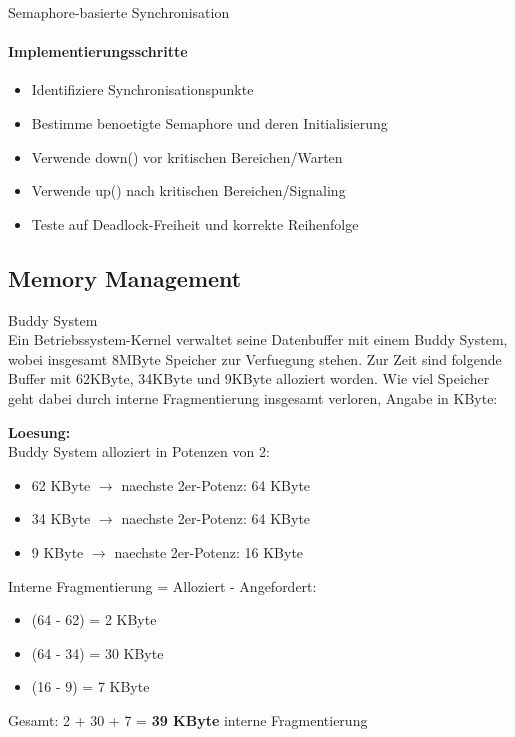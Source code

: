 \begin{KR}{Semaphore-basierte Synchronisation}
    \paragraph{Implementierungsschritte}
    \begin{itemize}
        \item Identifiziere Synchronisationspunkte
        \item Bestimme benoetigte Semaphore und deren Initialisierung
        \item Verwende down() vor kritischen Bereichen/Warten
        \item Verwende up() nach kritischen Bereichen/Signaling
        \item Teste auf Deadlock-Freiheit und korrekte Reihenfolge
    \end{itemize}
\end{KR}

\subsection{Memory Management}

\begin{example2}{Buddy System}\\
    Ein Betriebssystem-Kernel verwaltet seine Datenbuffer mit einem Buddy System, wobei insgesamt 8MByte Speicher zur Verfuegung stehen. Zur Zeit sind folgende Buffer mit 62KByte, 34KByte und 9KByte alloziert worden. Wie viel Speicher geht dabei durch interne Fragmentierung insgesamt verloren, Angabe in KByte:
    
    \tcblower
    
    \textbf{Loesung:}\\
    Buddy System alloziert in Potenzen von 2:
    
    \begin{itemize}
        \item 62 KByte $\rightarrow$ naechste 2er-Potenz: 64 KByte
        \item 34 KByte $\rightarrow$ naechste 2er-Potenz: 64 KByte  
        \item 9 KByte $\rightarrow$ naechste 2er-Potenz: 16 KByte
    \end{itemize}
    
    Interne Fragmentierung = Alloziert - Angefordert:
    \begin{itemize}
        \item (64 - 62) = 2 KByte
        \item (64 - 34) = 30 KByte
        \item (16 - 9) = 7 KByte
    \end{itemize}
    
    Gesamt: 2 + 30 + 7 = \textbf{39 KByte} interne Fragmentierung
\end{example2}


